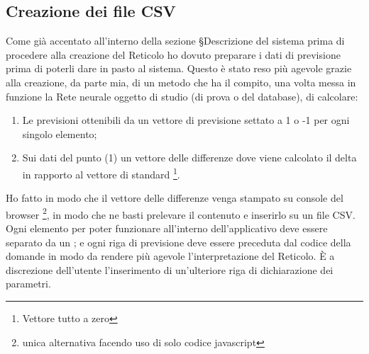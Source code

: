 \subsection{Creazione dei file CSV}
\label{Creazione dei file CSV}
Come gi\`a accentato all'interno della sezione §{Descrizione del sistema} prima di procedere alla creazione del Reticolo ho dovuto preparare i dati di previsione prima di poterli dare in pasto al sistema. Questo \`e stato reso pi\`u agevole grazie alla creazione, da parte mia, di un metodo che ha il compito, una volta messa in funzione la Rete neurale oggetto di studio (di prova o del database), di calcolare:
\begin{enumerate}
\item Le previsioni ottenibili da un vettore di previsione settato a 1 o -1 per ogni singolo elemento;
\item Sui dati del punto (1) un vettore delle differenze dove viene calcolato il delta in rapporto al vettore di standard \footnote{Vettore tutto a zero}.
\end{enumerate}
\noindent
Ho fatto in modo che il vettore delle differenze venga stampato su console del browser \footnote{unica alternativa facendo uso di solo codice javascript}, in modo che ne basti prelevare il contenuto e inserirlo su un file CSV. Ogni elemento per poter funzionare all'interno dell'applicativo deve essere separato da un ; e ogni riga di previsione deve essere preceduta dal codice della domande in modo da rendere pi\`u agevole l'interpretazione del Reticolo. \`E a discrezione dell'utente l'inserimento di un'ulteriore riga di dichiarazione dei parametri.

